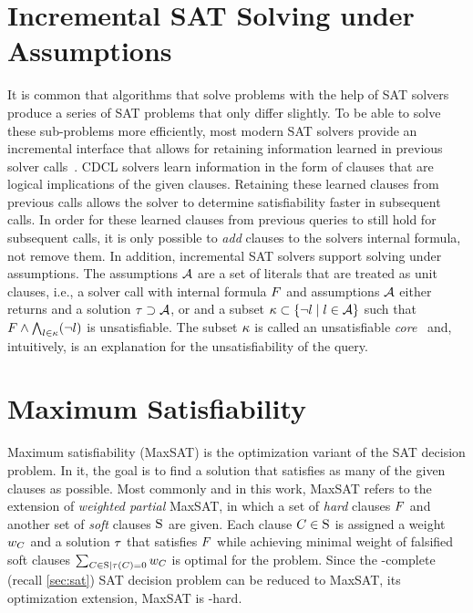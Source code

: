 \section{Incremental SAT Solving under Assumptions\label{sec:inc-sat}}

It is common that algorithms that solve problems with the help of SAT solvers produce a series of SAT problems that only differ slightly.
To be able to solve these sub-problems more efficiently, most modern SAT solvers provide an incremental interface that allows for retaining information learned in previous solver calls~\autocites{DBLP:journals/entcs/EenS03,handbook2-cdcl}.
CDCL solvers learn information in the form of clauses that are logical implications of the given clauses.
Retaining these learned clauses from previous calls allows the solver to determine satisfiability faster in subsequent calls.
In order for these learned clauses from previous queries to still hold for subsequent calls, it is only possible to \emph{add} clauses to the solvers internal formula, not remove them.
In addition, incremental SAT solvers support solving under assumptions.
The assumptions $\mathcal{A}$ are a set of literals that are treated as unit clauses, i.e., a solver call with internal formula $F$ and assumptions $\mathcal{A}$ either returns \sat{} and a solution $\tau \supset \mathcal{A}$, or \unsat{} and a subset $\kappa \subset \{\lnot l \mid l\in\mathcal{A}\}$ such that $F \land \bigwedge_{l \in \kappa} (\lnot l)$ is unsatisfiable.
The subset $\kappa$ is called an unsatisfiable \emph{core}~\autocite{handbook2-cdcl} and, intuitively, is an explanation for the unsatisfiability of the query.

\section{Maximum Satisfiability\label{sec:max-sat}}

Maximum satisfiability (MaxSAT) is the optimization variant of the SAT decision problem.
In it, the goal is to find a solution that satisfies as many of the given clauses as possible.
Most commonly and in this work, MaxSAT refers to the extension of \emph{weighted partial} MaxSAT, in which a set of \emph{hard} clauses $F$ and another set of \emph{soft} clauses $\textsc{S}$ are given.
Each clause $C \in \textsc{S}$ is assigned a weight $w_C$ and a solution $\tau$ that satisfies $F$ while achieving minimal weight of falsified soft clauses $\sum_{C\in\textsc{S} \mid \tau(C)=0} w_C$ is optimal for the problem.
Since the \NP-complete (recall \cref{sec:sat}) SAT decision problem can be reduced to MaxSAT, its optimization extension, MaxSAT is \NP-hard.

